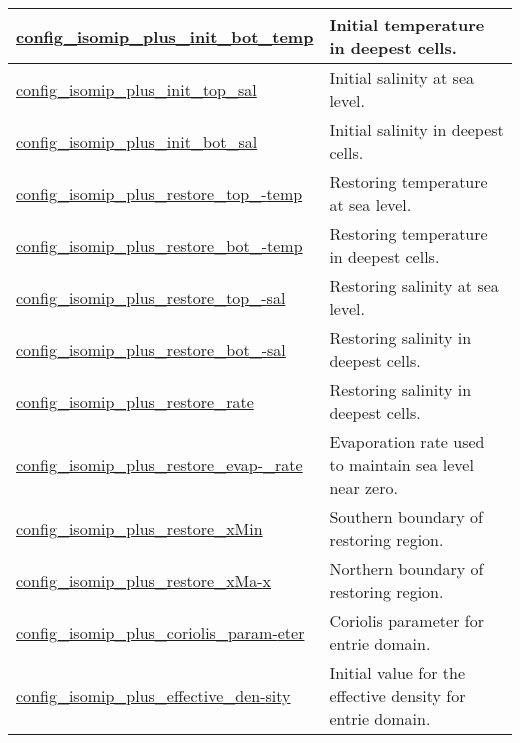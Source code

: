 {\begin{center}
\begin{longtable}{| p{2.0in} || p{4.0in} |}
    \hline
    \hyperref[subsec:nm_sec_config_isomip_plus_init_bot_temp]{config\_isomip\_plus\_init\_bot\_temp} & Initial temperature in deepest cells. \\
    \hline
    \hyperref[subsec:nm_sec_config_isomip_plus_init_top_sal]{config\_isomip\_plus\_init\_top\_sal} & Initial salinity at sea level. \\
    \hline
    \hyperref[subsec:nm_sec_config_isomip_plus_init_bot_sal]{config\_isomip\_plus\_init\_bot\_sal} & Initial salinity in deepest cells. \\
    \hline
    \hyperref[subsec:nm_sec_config_isomip_plus_restore_top_temp]{config\_isomip\_plus\_restore\_top\_-}\hyperref[subsec:nm_sec_config_isomip_plus_restore_top_temp]{temp}& Restoring temperature at sea level. \\
    \hline
    \hyperref[subsec:nm_sec_config_isomip_plus_restore_bot_temp]{config\_isomip\_plus\_restore\_bot\_-}\hyperref[subsec:nm_sec_config_isomip_plus_restore_bot_temp]{temp}& Restoring temperature in deepest cells. \\
    \hline
    \hyperref[subsec:nm_sec_config_isomip_plus_restore_top_sal]{config\_isomip\_plus\_restore\_top\_-}\hyperref[subsec:nm_sec_config_isomip_plus_restore_top_sal]{sal}& Restoring salinity at sea level. \\
    \hline
    \hyperref[subsec:nm_sec_config_isomip_plus_restore_bot_sal]{config\_isomip\_plus\_restore\_bot\_-}\hyperref[subsec:nm_sec_config_isomip_plus_restore_bot_sal]{sal}& Restoring salinity in deepest cells. \\
    \hline
    \hyperref[subsec:nm_sec_config_isomip_plus_restore_rate]{config\_isomip\_plus\_restore\_rate} & Restoring salinity in deepest cells. \\
    \hline
    \hyperref[subsec:nm_sec_config_isomip_plus_restore_evap_rate]{config\_isomip\_plus\_restore\_evap-}\hyperref[subsec:nm_sec_config_isomip_plus_restore_evap_rate]{\_rate}& Evaporation rate used to maintain sea level near zero. \\
    \hline
    \hyperref[subsec:nm_sec_config_isomip_plus_restore_xMin]{config\_isomip\_plus\_restore\_xMin} & Southern boundary of restoring region. \\
    \hline
    \hyperref[subsec:nm_sec_config_isomip_plus_restore_xMax]{config\_isomip\_plus\_restore\_xMa-}\hyperref[subsec:nm_sec_config_isomip_plus_restore_xMax]{x}& Northern boundary of restoring region. \\
    \hline
    \hyperref[subsec:nm_sec_config_isomip_plus_coriolis_parameter]{config\_isomip\_plus\_coriolis\_param-}\hyperref[subsec:nm_sec_config_isomip_plus_coriolis_parameter]{eter}& Coriolis parameter for entrie domain. \\
    \hline
    \hyperref[subsec:nm_sec_config_isomip_plus_effective_density]{config\_isomip\_plus\_effective\_den-}\hyperref[subsec:nm_sec_config_isomip_plus_effective_density]{sity}& Initial value for the effective density for entrie domain. \\
    \hline
\end{longtable}
\end{center}
}

